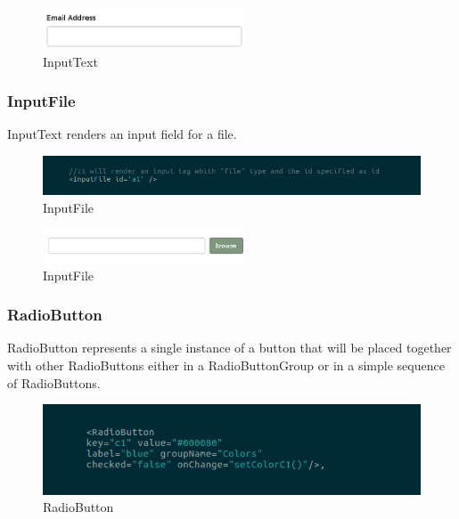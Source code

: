 \begin{figure}[H]
	\centering
	\includegraphics[width=6cm]{../../documenti/UserManualFramework/graphical_elements/inputTextGE.png}
	\caption{InputText}
\end{figure}

\subsubsection{InputFile}
InputText renders an input field for a file.
\begin{figure}[H]
	\centering
	\includegraphics[width=14cm]{../../documenti/UserManualFramework/framework_view/17framework_view_inputfile.png}
	\caption{InputFile}
\end{figure}

\begin{figure}[H]
	\centering
	\includegraphics[width=6cm]{../../documenti/UserManualFramework/graphical_elements/inputFileGE.png}
	\caption{InputFile}
\end{figure}

\subsubsection{RadioButton}
RadioButton represents a single instance of a button that will be placed together with other RadioButtons either in a RadioButtonGroup or in a simple sequence of RadioButtons.
\begin{figure}[H]
	\centering
	\includegraphics[width=14cm]{../../documenti/UserManualFramework/framework_view/7framework_view_radio.png}
	\caption{RadioButton}
\end{figure}

